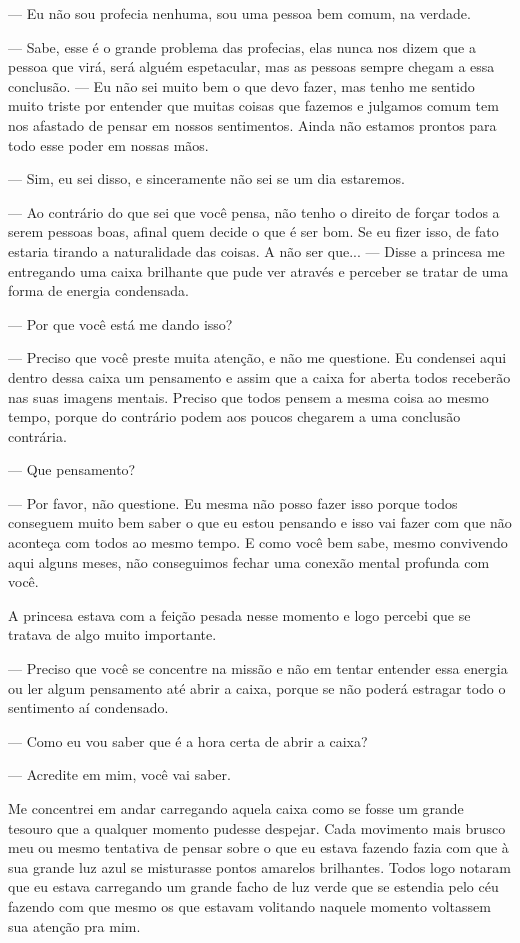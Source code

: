 — Eu não sou profecia nenhuma, sou uma pessoa bem comum, na verdade.

— Sabe, esse é o grande problema das profecias, elas nunca nos dizem que a pessoa que virá, será alguém espetacular, mas as pessoas sempre chegam a essa conclusão. — Eu não sei muito bem o que devo fazer, mas tenho me sentido muito triste por entender que muitas coisas que fazemos e julgamos comum tem nos afastado de pensar em nossos sentimentos. Ainda não estamos prontos para todo esse poder em nossas mãos.

— Sim, eu sei disso, e sinceramente não sei se um dia estaremos.

— Ao contrário do que sei que você pensa, não tenho o direito de forçar todos a serem pessoas boas, afinal quem decide o que é ser bom. Se eu fizer isso, de fato estaria tirando a naturalidade das coisas. A não ser que... — Disse a princesa me entregando uma caixa brilhante que pude ver através e perceber se tratar de uma forma de energia condensada.

— Por que você está me dando isso?

— Preciso que você preste muita atenção, e não me questione. Eu condensei aqui dentro dessa caixa um pensamento e assim que a caixa for aberta todos receberão nas suas imagens mentais. Preciso que todos pensem a mesma coisa ao mesmo tempo, porque do contrário podem aos poucos chegarem a uma conclusão contrária.

— Que pensamento?

— Por favor, não questione. Eu mesma não posso fazer isso porque todos conseguem muito bem saber o que eu estou pensando e isso vai fazer com que não aconteça com todos ao mesmo tempo. E como você bem sabe, mesmo convivendo aqui alguns meses, não conseguimos fechar uma conexão mental profunda com você.

A princesa estava com a feição pesada nesse momento e logo percebi que se tratava de algo muito importante.

— Preciso que você se concentre na missão e não em tentar entender essa energia ou ler algum pensamento até abrir a caixa, porque se não poderá estragar todo o sentimento aí condensado.

— Como eu vou saber que é a hora certa de abrir a caixa?

— Acredite em mim, você vai saber.

Me concentrei em andar carregando aquela caixa como se fosse um grande tesouro que a qualquer momento pudesse despejar. Cada movimento mais brusco meu ou mesmo tentativa de pensar sobre o que eu estava fazendo fazia com que à sua grande luz azul se misturasse pontos amarelos brilhantes. Todos logo notaram que eu estava carregando um grande facho de luz verde que se estendia pelo céu fazendo com que mesmo os que estavam volitando naquele momento voltassem sua atenção pra mim.


